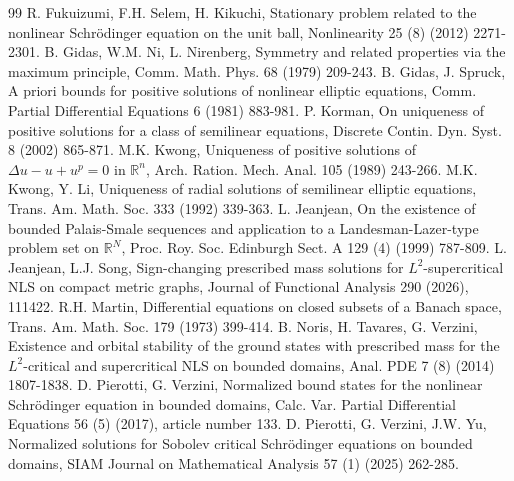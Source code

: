 \documentclass[10pt,a4paper]{article}
\theoremstyle{definition} \theoremstyle{remark}
\numberwithin{equation}{section}
\newcommand{\R}{\mathbb{R}}
\begin{document}
\begin{thebibliography}{99}
	  R. Fukuizumi, F.H. Selem, H. Kikuchi, Stationary problem related to the nonlinear Schr\"odinger equation on the unit ball, Nonlinearity 25 (8) (2012) 2271-2301.
	 B. Gidas, W.M. Ni, L. Nirenberg, Symmetry and related properties via the maximum principle, Comm. Math. Phys. 68 (1979) 209-243.
	  B. Gidas, J. Spruck, A priori bounds for positive solutions of nonlinear elliptic equations, Comm. Partial Differential Equations 6 (1981) 883-981.
	  P. Korman, On uniqueness of positive solutions for a class of semilinear equations, Discrete Contin. Dyn. Syst. 8 (2002) 865-871.
	  M.K. Kwong, Uniqueness of positive solutions of $\Delta u - u + u^p = 0$ in $\R^n$, Arch. Ration. Mech. Anal. 105 (1989)
	243-266.
	  M.K. Kwong, Y. Li, Uniqueness of radial solutions of semilinear elliptic equations, Trans. Am. Math. Soc. 333 (1992) 339-363.
	  L. Jeanjean, On the existence of bounded Palais-Smale sequences and application to a Landesman-Lazer-type problem set on $\R^N$, Proc. Roy. Soc. Edinburgh Sect. A 129 (4) (1999) 787-809.
	 L. Jeanjean, L.J. Song, Sign-changing prescribed mass solutions for $L^2$-supercritical NLS on compact metric graphs, Journal of Functional Analysis 290 (2026), 111422.
	  R.H. Martin, Differential equations on closed subsets of a Banach space, Trans. Am. Math. Soc. 179 (1973) 399-414.
	  B. Noris, H. Tavares, G. Verzini, Existence and orbital stability of the ground states with prescribed mass for the $L^2$-critical and supercritical NLS on bounded domains, Anal. PDE 7 (8) (2014) 1807-1838.
	  D. Pierotti, G. Verzini, Normalized bound states for the nonlinear Schr\"odinger equation in bounded domains, Calc. Var. Partial Differential Equations 56 (5) (2017), article number 133.
	  D. Pierotti, G. Verzini, J.W. Yu, Normalized solutions for Sobolev critical Schr\"odinger equations on bounded domains, SIAM Journal on Mathematical Analysis 57 (1) (2025) 262-285.

\end{thebibliography}
\end{document}
